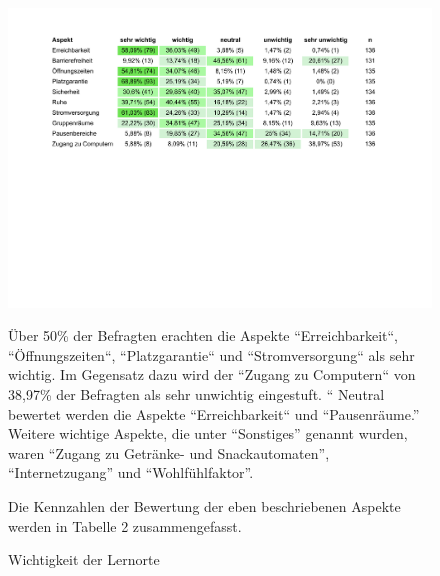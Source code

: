 \documentclass[11pt, a4paper]{article}
\begin{document}
\begin{figure}[htbp]
	\vspace*{6.2cm}
	\hspace*{-1.95cm}
	\includegraphics[scale = 0.746, trim=0.5cm 11cm 0.5cm 11cm]{Tabellen.pdf}
	\caption{Wichtigkeit der Lernorte}
	\vspace{0.5cm}
   Über 50\% der Befragten erachten die Aspekte “Erreichbarkeit“, “Öffnungszeiten“, “Platzgarantie“ und “Stromversorgung“ als sehr wichtig. Im Gegensatz dazu wird der “Zugang zu Computern“ von 38,97\% der Befragten als sehr unwichtig eingestuft. “ Neutral bewertet werden die Aspekte “Erreichbarkeit“ und “Pausenräume.”
   Weitere wichtige Aspekte, die unter “Sonstiges” genannt wurden, waren “Zugang zu Getränke- und Snackautomaten”, “Internetzugang” und “Wohlfühlfaktor”.

   
	Die Kennzahlen der Bewertung der eben beschriebenen Aspekte werden in Tabelle 2 zusammengefasst.
\end{figure}
\end{document}
